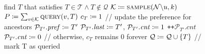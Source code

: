 \begin{figure}
\begin{center}
\small
\begin{algorithmic}[1]
        \While {\codetrue}
            \State\textrm{find  $T$ that satisfies }%
            $T \in \mathcal{T} \land T \notin \mathcal{Q}$
            \State $\mathcal{K} \assign \Call{sample}{\mathcal{N}\backslash u, k}$
            \State $P \assign \sum_{v \in \mathcal{K}}\Call{query}{v, T}$
                \State $c_T \coloneqq 1$
            \State\textrm{// update the preference for ancestors}
                    \State $\mathcal{P}_{T'}\mathit{.pref} \coloneqq T'$
                \EndIf
                    \State $\mathcal{P}_{T'}\mathit{.last} \coloneqq T'$, $\mathcal{P}_{T'}\mathit{.cnt} \coloneqq 1$
                \Else
                    \State \texttt{++}$\mathcal{P}_{T'}\mathit{.cnt}$
                \EndIf
            \EndFor
            \Else
                    \State$\mathcal{P}_{T'}\mathit{.cnt} \coloneqq 0$
            \EndFor
            \EndIf
            \State\textrm{// otherwise, }$c_T$\textrm{ remains 0 forever}
            \State $\mathcal{Q} \coloneqq \mathcal{Q} \cup \{T\}$ \hspace {1ex} \textrm{// mark T as queried}
        \EndWhile
    \EndProcedure
    \label{fig:gossipchain-main}
\end{algorithmic}
\end{center}
\end{figure}

